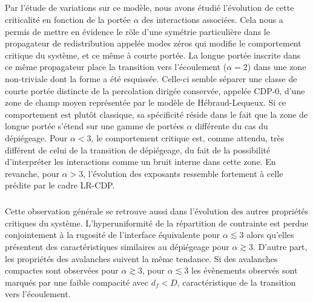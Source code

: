 \subparagraph{}Par l'étude de variations sur ce modèle, nous avons étudié l'évolution de cette criticalité en fonction de la portée $\alpha$ des interactions associées. Cela nous a permis de mettre en évidence le rôle d'une symétrie particulière dans le propagateur de redistribution appelée modes zéros qui modifie le comportement critique du système, et ce même à courte portée. La longue portée inscrite dans ce même propagateur place la transition vers l'écoulement ($\alpha = 2$) dans une zone non-triviale dont la forme a été esquissée. Celle-ci semble séparer une classe de courte portée distincte de la percolation dirigée conservée, appelée CDP-0, d'une zone de champ moyen représentée par le modèle de Hébraud-Lequeux. Si ce comportement est plutôt classique, sa spécificité réside dans le fait que la zone de longue portée s'étend sur une gamme de portées $\alpha$ différente du cas du dépiégeage. Pour $\alpha < 3$, le comportement critique est, comme attendu, très différent de celui de la transition de dépiégeage, du fait de la possibilité d'interpréter les interactions comme un bruit interne dans cette zone. En revanche, pour $\alpha > 3$, l'évolution des exposants ressemble fortement à celle prédite par le cadre LR-CDP.

\subparagraph{}Cette observation générale se retrouve aussi dans l'évolution des autres propriétés critiques du système. L'hyperuniformité de la répartition de contrainte est perdue conjointement à la rugosité de l'interface équivalente pour $\alpha\lesssim 3$ alors qu'elles présentent des caractéristiques similaires au dépiégeage pour $\alpha\gtrsim 3$. D'autre part, les propriétés des avalanches suivent la même tendance. Si des avalanches compactes sont observées pour $\alpha\gtrsim 3$, pour $\alpha\lesssim 3$ les évènements observés sont marqués par une faible compacité avec $d_f < D$, caractéristique de la transition vers l'écoulement. 
